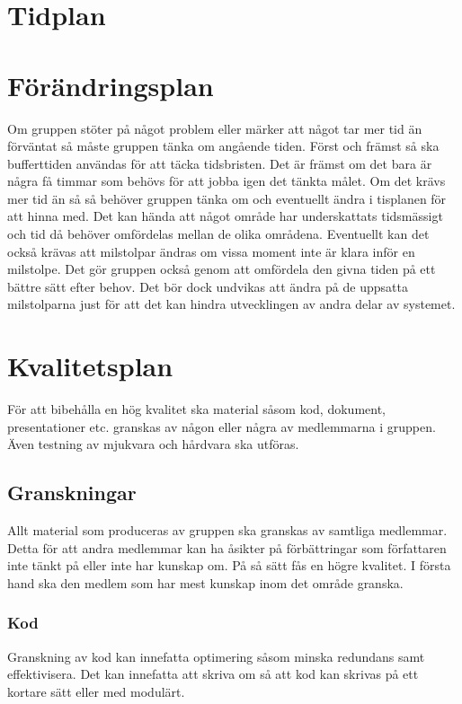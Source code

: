 \documentclass[projektplan/plan.tex]{subfiles}
\begin{document}
\section{Tidplan}

\section{Förändringsplan}
Om gruppen stöter på något problem eller märker att något tar mer tid än förväntat så måste gruppen tänka om angående tiden. Först och främst så ska bufferttiden användas för att täcka tidsbristen. Det är främst om det bara är några få timmar som behövs för att jobba igen det tänkta målet. Om det krävs mer tid än så så behöver gruppen tänka om och eventuellt ändra i tisplanen för att hinna med. Det kan hända att något område har underskattats tidsmässigt och tid då behöver omfördelas mellan de olika områdena. Eventuellt kan det också krävas att milstolpar ändras om vissa moment inte är klara inför en milstolpe. Det gör gruppen också genom att omfördela den givna tiden på ett bättre sätt efter behov. Det bör dock undvikas att ändra på de uppsatta milstolparna just för att det kan hindra utvecklingen av andra delar av systemet.

\section{Kvalitetsplan}
För att bibehålla en hög kvalitet ska material såsom kod, dokument,
presentationer etc. granskas av någon eller några av medlemmarna i gruppen.
Även testning av mjukvara och hårdvara ska utföras.

\subsection{Granskningar}
Allt material som produceras av gruppen ska granskas av samtliga medlemmar.
Detta för att andra medlemmar kan ha åsikter på förbättringar som författaren
inte tänkt på eller inte har kunskap om. På så sätt fås en högre kvalitet. I
första hand ska den medlem som har mest kunskap inom det område granska.

\subsubsection{Kod}	
Granskning av kod kan innefatta optimering såsom minska redundans samt
effektivisera. Det kan innefatta att skriva om så att kod kan skrivas på ett
kortare sätt eller med modulärt.
\end{document}
